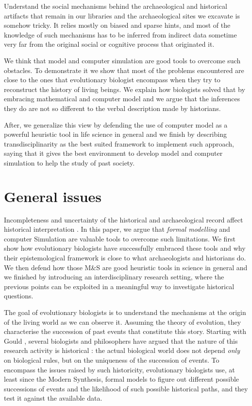 \documentclass[a4paper]{article}
\begin{document}
Understand the social mechanisms behind the archaeological and historical artifacts that remain in our libraries and the archaeological sites we excavate is somehow tricky. It relies mostly on biased and sparse hints, and most of the knowledge of such mechanisms has to be inferred from indirect data sometime very far from the original social or cognitive process that originated it.

We think that model and computer simulation are good tools to overcome such obstacles. To demonstrate it we show that most of the problems encountered are close to the ones that evolutionary biologist encompass when they try to reconstruct the history of living beings. We explain how biologists solved that by embracing mathematical and computer model and we argue that the inferences they do are not so different to the verbal description made by historians.

After, we  generalize this view by defending the use of computer model as a powerful heuristic tool in life science in general and we finish by describing transdisciplinarity as the best suited framework to implement such approach, saying that it gives the best environment to develop model and computer simulation to help the study of past society.

\section{General issues}
 



Incompleteness and uncertainty of the historical and archaeological record affect historical interpretation \cite{madella2014}. In this paper, we argue that \emph{formal modelling} and computer Simulation are valuable tools to overcome such limitations. We first show how evolutionary biologists have successfully embraced these tools and why their epistemological framework is close to what archaeologists and historians do. We then defend how those M\&S are good heuristic tools in science in general and we finished by introducing an interdisciplinary research setting, where the previous points can be exploited in a meaningful way to investigate historical questions.

The goal of evolutionary biologists is to understand the mechanisms at the origin of the living world as we can observe it. Assuming the theory of evolution, they characterise the succession of past events that constitute this story. Starting with Gould \cite{gould1989wonderfullife}, several biologists and philosophers have argued that the nature of this research activity is historical \cite{beatty1995evolutionary}: the actual biological world does not depend \emph{only} on biological rules, but on the uniqueness of the succession of events. To encompass the issues raised by such historicity, evolutionary biologists use, at least since the Modern Synthesis, formal models to figure out different possible successions of events and the likelihood of such possible historical paths, and they test it against the available data.
\end{document}
